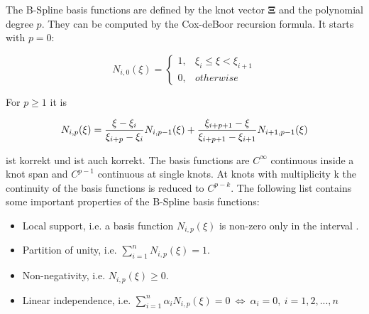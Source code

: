 The B-Spline basis functions are defined by the knot vector $\mathbf{\Xi}$ and the polynomial degree $p$. They can be computed by the Cox-deBoor recursion formula. It starts with $p=0$: 

\begin{equation}
			N_{i,0}(\xi)=\begin{cases}
		  1,  & \xi_i \leqslant \xi < \xi_{i+1}\\
		  0, & otherwise
		\end{cases}
	\label{eq:CoxPnull}
\end{equation}

For $p\geqslant 1$ it is

\begin{equation}
			N_{i,p}(\xi)=\frac{\xi-\xi_i}{\xi_{i+p}-\xi_i} N_{i,p-1}(\xi)+\frac{\xi_{i+p+1}-\xi}{\xi_{i+p+1}-\xi_{i+1}}N_{i+1,p-1}(\xi)\\
	\label{eq:CoxPrest}
\end{equation}

 ist korrekt und  ist auch korrekt.
The basis functions are $C^{\infty}$ continuous inside a knot span and $C^{p-1}$ continuous at single knots. At knots with multiplicity k the continuity of the basis functions is reduced to $C^{p-k}$. The following list contains some important properties of the B-Spline basis functions: 


\begin{itemize}
\item Local support, i.e. a basis function  \begin{math} N_{i,p}(\xi) \end{math} is non-zero only in the interval \begin{math} [\xi_{i},\xi_{i+p+1}] \end{math}.
\item Partition of unity, i.e. \begin{math} \sum_{i=1}^n N_{i,p}(\xi)=1\end{math}.
\item Non-negativity, i.e. \begin{math} N_{i,p}(\xi) \geqslant 0 \end{math}.
\item Linear independence, i.e. \begin{math} \sum_{i=1}^n \alpha_i N_{i,p}(\xi)=0~\Leftrightarrow~\alpha_i=0,~i=1,2,...,n \end{math}
\end{itemize}

